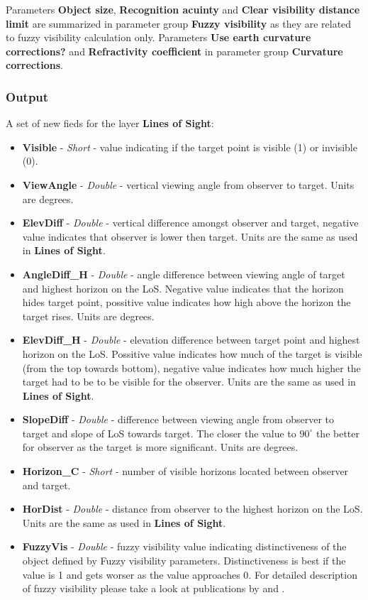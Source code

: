 \documentclass[]{article}
\begin{document}
Parameters \textbf{Object size}, \textbf{Recognition acuinty} and \textbf{Clear visibility distance limit} are summarized in parameter group \textbf{Fuzzy visibility} as they are related to fuzzy visibility calculation only. Parameters \textbf{Use earth curvature corrections?} and \textbf{Refractivity coefficient} in parameter group \textbf{Curvature corrections}.

\subsubsection{Output}

A set of new fieds for the layer \textbf{Lines of Sight}:
\begin{itemize}
	\item \textbf{Visible} - \textit{Short} - value indicating if the target point is visible (1) or invisible (0).
	\item \textbf{ViewAngle} - \textit{Double} - vertical viewing angle from observer to target. Units are degrees.
	\item \textbf{ElevDiff} - \textit{Double} - vertical difference amongst observer and target, negative value indicates that observer is lower then target. Units are the same as used in \textbf{Lines of Sight}.
	\item \textbf{AngleDiff\_H} - \textit{Double} - angle difference between viewing angle of target and highest horizon on the LoS. Negative value indicates that the horizon hides target point, possitive value indicates how high above the horizon the target rises. Units are degrees.
	\item \textbf{ElevDiff\_H} - \textit{Double} - elevation difference between target point and highest horizon on the LoS. Possitive value indicates how much of the target is visible (from the top towards bottom), negative value indicates how much higher the target had to be to be visible for the observer. Units are the same as used in \textbf{Lines of Sight}.
	\item \textbf{SlopeDiff} - \textit{Double} - difference between viewing angle from observer to target and slope of LoS towards target. The closer the value to $90^\circ$ the better for observer as the target is more significant. Units are degrees.
	\item \textbf{Horizon\_C} - \textit{Short} - number of visible horizons located between observer and target.
	\item \textbf{HorDist} - \textit{Double} - distance from observer to the highest horizon on the LoS. Units are the same as used in \textbf{Lines of Sight}.
	\item \textbf{FuzzyVis} - \textit{Double} - fuzzy visibility value indicating distinctiveness of the object defined by Fuzzy visibility parameters. Distinctiveness is best if the value is 1 and gets worser as the value approaches 0. For detailed description of fuzzy visibility please take a look at publications by \cite{Fisher1994} and \cite{Ogburn2006}.
\end{itemize}
\end{document}

